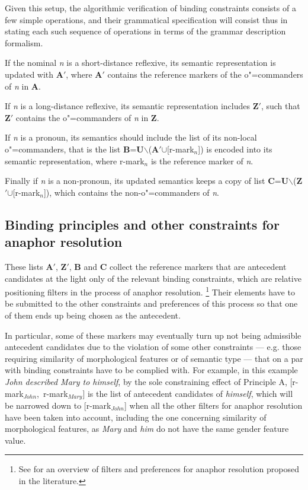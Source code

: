 \documentclass[output=paper
,modfonts
,nonflat]{langsci/langscibook}
\begin{document}
Given this setup, the algorithmic verification of 
binding constraints consists of a few simple operations, and their
grammatical specification will consist thus in stating each such sequence of
operations in terms of the grammar description formalism. 

If the nominal {\it n} is a short-distance
reflexive, its semantic  representation is updated with \textbf{A$'$}, where \textbf{A$'$}
contains the reference  markers of the \mbox{o"=commanders} of {\it n} in \textbf{A}. 

If {\it n} is a
long-distance  reflexive, its semantic representation includes \textbf{Z$'$}, such that \textbf{Z$'$}
contains the \mbox{o"=commanders} of {\it n} in \textbf{Z}. 

If {\it n} is a pronoun, its semantics 
should include the list of its non-local \linebreak o"=commanders,
that is the list
\textbf{B}=\textbf{U}$\backslash$(\textbf{A$'$}$\cup$[r-mark$_{n}$])
is encoded into its semantic representation, where r-mark$_{n}$ is the reference marker
of {\it n}.

Finally if {\it n} 
is a non-pronoun, its updated semantics keeps a copy of 
list \linebreak \textbf{C}=\textbf{U}$\backslash$(\textbf{Z$'$}$\cup$[r-mark$_{n}$]),
which contains the non-o"=commanders of {\it n}.


\subsection{Binding principles and other constraints for anaphor resolution}

These lists \textbf{A$'$}, \textbf{Z$'$}, \textbf{B} and \textbf{C} collect
the reference markers that are antecedent candidates
at the light only of the relevant binding constraints, which are
relative positioning filters in the process of anaphor resolution.%
%
\footnote{See \cite[Chap.2]{branco:diss99} for an overview
of filters and preferences for anaphor resolution proposed in the literature.
}
% 
Their elements have to be submitted to the other constraints and preferences
of this process so that one of them ends up 
being chosen as the antecedent.

In particular, some of these markers 
may eventually turn up not being admissible antecedent candidates due to the violation of some
other constraints --- e.g. those requiring similarity of morphological features
or of semantic type --- that on a par with binding constraints
have to be complied with. For example, in this example {\it John described Mary to himself}, by the sole
constraining effect of Principle A, \mbox{[r-mark$_{John}$, r-mark$_{Mary}$]} 
is the list of antecedent candidates of
{\it himself}, which will be narrowed down to [r-mark$_{John}$] when all the other
filters for anaphor resolution have been taken into account, including
the one concerning similarity of morphological features,
as {\it Mary} and {\it him} do not have the same gender feature value.
\end{document}
